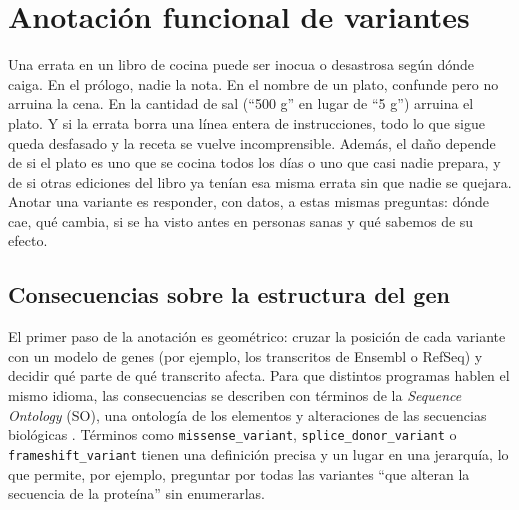 \section{Anotación funcional de variantes}\label{sec:09-anotacion}

\begin{intuicion}
Una errata en un libro de cocina puede ser inocua o desastrosa según dónde caiga. En el prólogo, nadie la nota. En el nombre de un plato, confunde pero no arruina la cena. En la cantidad de sal (``500 g'' en lugar de ``5 g'') arruina el plato. Y si la errata borra una línea entera de instrucciones, todo lo que sigue queda desfasado y la receta se vuelve incomprensible. Además, el daño depende de si el plato es uno que se cocina todos los días o uno que casi nadie prepara, y de si otras ediciones del libro ya tenían esa misma errata sin que nadie se quejara. Anotar una variante es responder, con datos, a estas mismas preguntas: dónde cae, qué cambia, si se ha visto antes en personas sanas y qué sabemos de su efecto.
\end{intuicion}

\subsection{Consecuencias sobre la estructura del gen}

El primer paso de la anotación es geométrico: cruzar la posición de cada variante con un modelo de genes (por ejemplo, los transcritos de Ensembl o RefSeq) y decidir qué parte de qué transcrito afecta. Para que distintos programas hablen el mismo idioma, las consecuencias se describen con términos de la \emph{Sequence Ontology} (SO), una ontología de los elementos y alteraciones de las secuencias biológicas \parencite{c09-eilbeck2005}. Términos como \texttt{missense\_variant}, \texttt{splice\_donor\_variant} o \texttt{frameshift\_variant} tienen una definición precisa y un lugar en una jerarquía, lo que permite, por ejemplo, preguntar por todas las variantes ``que alteran la secuencia de la proteína'' sin enumerarlas.

